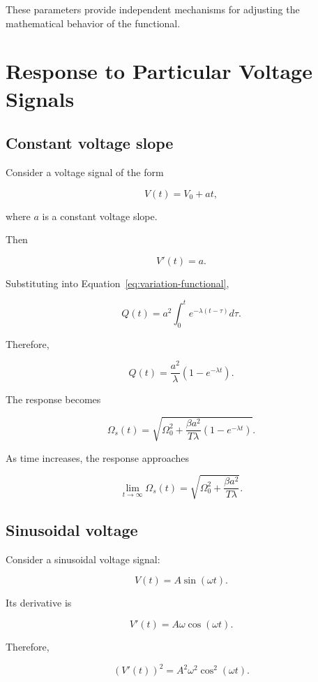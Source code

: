 \documentclass[12pt]{article}
\theoremstyle{definition}
\theoremstyle{remark}
\begin{document}
These parameters provide independent
mechanisms for adjusting the mathematical
behavior of the functional.

\section{Response to Particular Voltage Signals}

\subsection{Constant voltage slope}

Consider a voltage signal of the form

\[
V(t)=V_0+at,
\]

where \(a\) is a constant voltage slope.

Then

\[
V'(t)=a.
\]

Substituting into Equation~\eqref{eq:variation-functional},

\[
Q(t)=
a^2\int_0^t e^{-\lambda(t-\tau)}d\tau.
\]

Therefore,

\[
Q(t)=
\frac{a^2}{\lambda}
\left(1-e^{-\lambda t}\right).
\]

The response becomes

\begin{equation}
\Omega_s(t)=
\sqrt{
\Omega_0^2+
\frac{\beta a^2}{T\lambda}
\left(1-e^{-\lambda t}\right)
}.
\label{eq:linear-voltage}
\end{equation}

As time increases, the response approaches

\begin{equation}
\lim_{t\to\infty}\Omega_s(t)
=
\sqrt{
\Omega_0^2+
\frac{\beta a^2}{T\lambda}
}.
\end{equation}

\subsection{Sinusoidal voltage}

Consider a sinusoidal voltage signal:

\[
V(t)=A\sin(\omega t).
\]

Its derivative is

\[
V'(t)=A\omega\cos(\omega t).
\]

Therefore,

\[
(V'(t))^2=
A^2\omega^2\cos^2(\omega t).
\]
\end{document}
